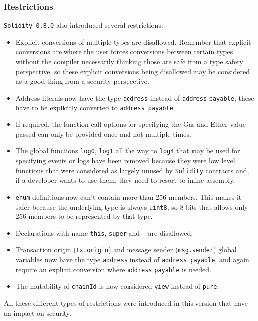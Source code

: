 \subsubsection{Restrictions}\label{restrictions}

\texttt{Solidity\ 0.8.0} also introduced several restrictions:

\begin{itemize}
\tightlist
\item
  Explicit conversions of multiple types are disallowed. Remember that
  explicit conversions are where the user forces conversions between
  certain types without the compiler necessarily thinking those are safe
  from a type safety perspective, so these explicit conversions being
  disallowed may be considered as a good thing from a security
  perspective.
\item
  Address literals now have the type \texttt{address} instead of
  \texttt{address} \texttt{payable}, these have to be explicitly
  converted to \texttt{address\ payable}.
\item
  If required, the function call options for specifying the Gas and
  Ether value passed can only be provided once and not multiple times.
\item
  The global functions \texttt{log0}, \texttt{log1} all the way to
  \texttt{log4} that may be used for specifying events or logs have been
  removed because they were low level functions that were considered as
  largely unused by \texttt{Solidity} contracts and, if a developer
  wants to use them, they need to resort to inline assembly.
\item
  \texttt{enum} definitions now can't contain more than 256 members.
  This makes it safer because the underlying type is always
  \texttt{uint8}, so 8 bits that allows only 256 members to be
  represented by that type.
\item
  Declarations with name \texttt{this}, \texttt{super} and \texttt{\_}
  are disallowed.
\item
  Transaction origin (\texttt{tx.origin}) and message sender
  (\texttt{msg.sender}) global variables now have the type
  \texttt{address} instead of \texttt{address\ payable}, and again
  require an explicit conversion where \texttt{address} \texttt{payable}
  is needed.
\item
  The mutability of \texttt{chainId} is now considered \texttt{view}
  instead of \texttt{pure}.
\end{itemize}

All these different types of restrictions were introduced in this
version that have an impact on security.
